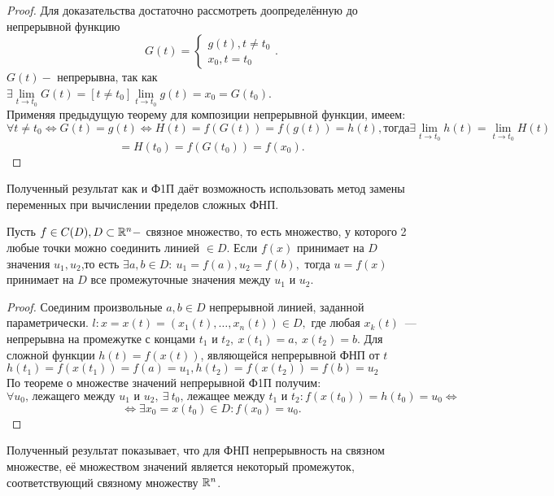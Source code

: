 \documentclass[../../main.tex]{subfiles}
\begin{document}
    \begin{proof}
    	Для доказательства достаточно рассмотреть доопределённую до непрерывной
    	функцию \begin{equation*}
    		G(t) = \begin{cases}
    			g(t), t \ne t_0\\
    			x_0, t = t_0 
    		\end{cases}.
    	\end{equation*} 
    $G(t) -$ непрерывна, так как $\exists \lim\limits_{t \to t_0} G(t) = 
    \left[ t \ne t_0 \right] \lim\limits_{t \to t_0} g(t) = x_0 = G(t_0)$.
    \\
    Применяя предыдущую теорему для композиции непрерывной функции, имеем:\\
    \[
      	\forall t \ne t_0 \iff G(t) = g(t) \iff H(t) = f(G(t)) = f(g(t)) = h(t),
      	тогда \exists \lim\limits_{t \to t_0} h(t) 
      	= \lim\limits_{t \to t_0} H(t) 
    \] 
    \[
   		= H(t_0) = f(G(t_0)) = f(x_0).
    \]
    \end{proof}
	Полученный результат как и Ф1П даёт возможность использовать метод замены
	переменных при вычислении пределов сложных ФНП.
	\begin{thm}
		Пусть $f \in C(D), D \subset \mathbb{R}^n - $ связное множество, то есть 
		множество, у которого 2 любые точки можно соединить линией  $\in D$.
		Если $f(x)$ принимает на $D$ значения $u_1, u_2$,то есть $\exists 
		a, b \in D: \ u_1 = f(a), u_2 = f(b),$ тогда $u = f(x)$ принимает
		на $D$ все промежуточные значения между $u_1$ и $u_2$.
	\end{thm}
	\begin{proof}
		Соединим произвольные $a, b \in D$ непрерывной линией, заданной 
		параметрически. $l: x = x(t) = (x_1(t), \ldots, x_n(t))\in D,$
		где любая $x_k(t) $~--- непрерывна на промежутке с концами $t_1$ и $t_2,
		\ x(t_1) = a, \ x(t_2) = b$. Для сложной функции $h(t) = f(x(t))$, 
		являющейся непрерывной ФНП от $t$\\
		$h(t_1) = f(x(t_1)) = f(a) = u_1, h(t_2) = f(x(t_2)) = f(b) = u_2$\\
		По теореме о множестве значений непрерывной Ф1П получим:
		\[
		\forall u_0 \text{, лежащего между } u_1\text{ и } u_2 , \ \exists \ t_0
		\text{, лежащее между } t_1\text{ и } t_2 :f(x(t_0)) = h(t_0) = u_0 \iff
		\]
		\[
		\iff \exists x_0 = x(t_0) \in D : f(x_0) = u_0.
		\]
	\end{proof}
	\begin{rem}
		Полученный результат показывает, что для ФНП непрерывность на связном
		множестве, её множеством значений является некоторый промежуток,
		соответствующий связному множеству $\mathbb{R}^n$.\\
	\end{rem}
\end{document}
